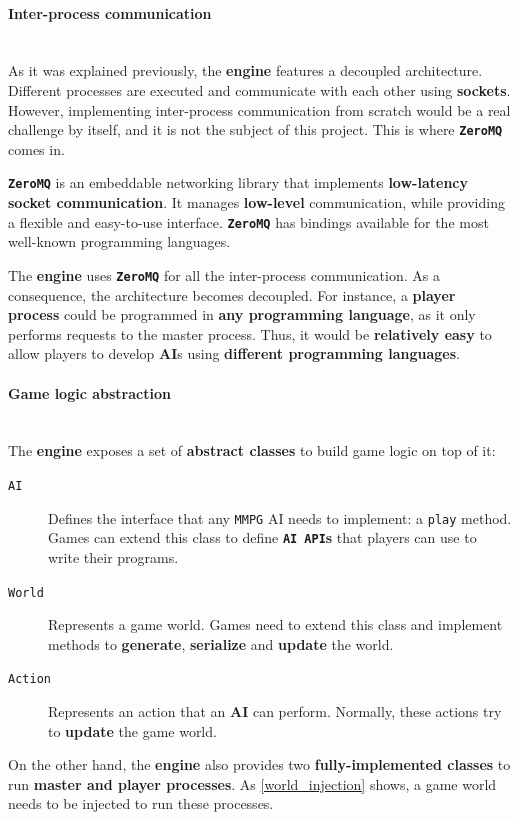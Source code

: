 \documentclass[a4paper,11pt]{article}
\begin{document}
\paragraph{Inter-process communication}
\hfill
\\[0.2cm]
\indent
As it was explained previously, the \textbf{engine} features a decoupled architecture. Different processes are
executed and communicate with each other using \textbf{sockets}. However, implementing inter-process communication from
scratch would be a real challenge by itself, and it is not the subject of this project. This is where \textbf{\texttt{ZeroMQ}} comes
in.

\textbf{\texttt{ZeroMQ}} is an embeddable networking library that implements \textbf{low-latency socket communication}. It manages
\textbf{low-level} communication, while providing a flexible and easy-to-use interface. \textbf{\texttt{ZeroMQ}} has bindings available
for the most well-known programming languages.

The \textbf{engine} uses \textbf{\texttt{ZeroMQ}} for all the inter-process communication. As a consequence, the architecture becomes
decoupled. For instance, a \textbf{player process} could be programmed in \textbf{any programming language}, as it
only performs requests to the master process. Thus, it would be \textbf{relatively easy} to allow players to develop
\textbf{AI}s using \textbf{different programming languages}.
\paragraph{Game logic abstraction}
\hfill
\\[0.2cm]
\indent
The \textbf{engine} exposes a set of \textbf{abstract classes} to build game logic on top of it:
\begin{description}
\item[\texttt{AI}]
Defines the interface that any \texttt{MMPG} AI needs to implement: a \texttt{play} method. Games can extend
  this class to define \textbf{\texttt{AI API}s} that players can use to write their programs.
\item[\texttt{World}]
Represents a game world. Games need to extend this class and implement methods to
  \textbf{generate}, \textbf{serialize} and \textbf{update} the world.
\item[\texttt{Action}]
Represents an action that an \textbf{AI} can perform. Normally, these actions try to \textbf{update}
  the game world.
\end{description}
On the other hand, the \textbf{engine} also provides two \textbf{fully-implemented classes} to run \textbf{master and player
processes}. As \autoref{world_injection} shows, a game world needs to be injected to run these processes.
\end{document}
